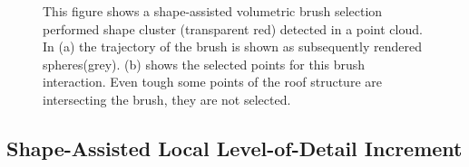 \begin{figure}
    \centering
    \par\medskip
    \caption[Workflow of the shape-assisted volumetric brush. (a) shows the trajectory of the brush, (b) shows the selected points. ]
    {This figure shows a shape-assisted volumetric brush selection performed shape cluster (transparent red) detected in a point cloud. In (a) the trajectory of the brush is shown as subsequently rendered spheres(grey). (b) shows the selected points for this brush interaction. Even tough some points of the roof structure are intersecting the brush, they are not selected. }
\label{fig:brush}
\end{figure}


\subsection{Shape-Assisted Local Level-of-Detail Increment}
\label{sec:lod_increment}
    
